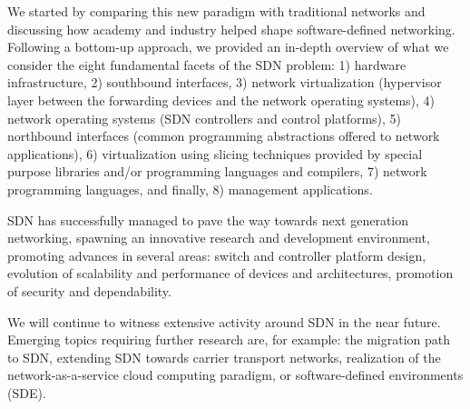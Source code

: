 We started by comparing this new paradigm with traditional networks
and discussing how academy and industry helped shape software-defined
networking.  Following a bottom-up approach, we provided an in-depth
overview of what we consider the eight fundamental facets of the SDN
problem: 1) hardware infrastructure, 2) southbound interfaces, 3)
network virtualization (hypervisor layer between the forwarding
devices and the network operating systems), 4) network operating
systems (SDN controllers and control platforms), 5) northbound
interfaces (common programming abstractions offered to network
applications), 6) virtualization using slicing techniques provided by
special purpose libraries and/or programming languages and compilers,
7) network programming languages, and finally, 8) management
applications.


SDN has successfully managed to pave the way towards next generation
networking, spawning an innovative research and development
environment, promoting advances in several areas: switch and
controller platform design, evolution of scalability and performance
of devices and architectures, promotion of security and dependability.

We will continue to witness extensive activity around SDN in the near
future. Emerging topics requiring further research are, for example:
the migration path to SDN, extending SDN towards carrier transport networks, realization of the
network-as-a-service cloud computing paradigm, or software-defined
environments (SDE).




